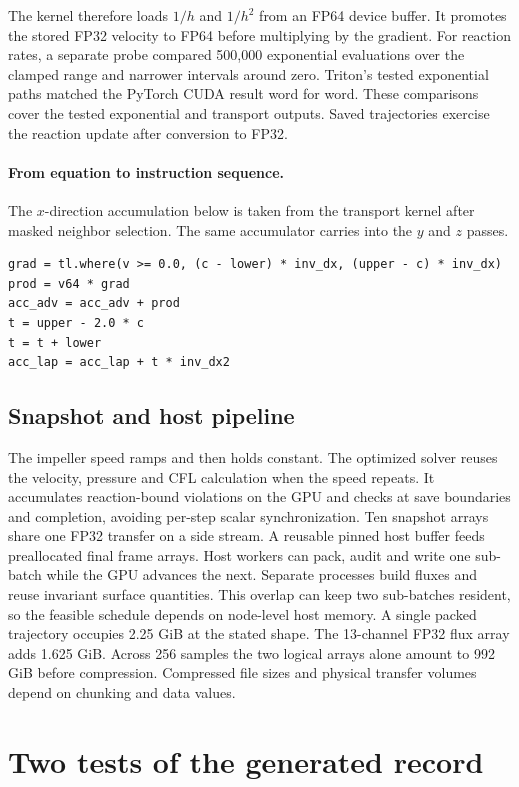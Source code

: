 \documentclass{article}
\begin{document}
The kernel therefore loads $1/h$ and $1/h^2$ from an FP64 device buffer. It promotes the stored FP32 velocity to FP64 before multiplying by the gradient. For reaction rates, a separate probe compared 500,000 exponential evaluations over the clamped range and narrower intervals around zero. Triton's tested exponential paths matched the PyTorch CUDA result word for word. These comparisons cover the tested exponential and transport outputs. Saved trajectories exercise the reaction update after conversion to FP32.

\paragraph{From equation to instruction sequence.} The $x$-direction accumulation below is taken from the transport kernel after masked neighbor selection. The same accumulator carries into the $y$ and $z$ passes.
{\small
\begin{verbatim}
grad = tl.where(v >= 0.0, (c - lower) * inv_dx, (upper - c) * inv_dx)
prod = v64 * grad
acc_adv = acc_adv + prod
t = upper - 2.0 * c
t = t + lower
acc_lap = acc_lap + t * inv_dx2
\end{verbatim}
}

\subsection{Snapshot and host pipeline}
The impeller speed ramps and then holds constant. The optimized solver reuses the velocity, pressure and CFL calculation when the speed repeats. It accumulates reaction-bound violations on the GPU and checks at save boundaries and completion, avoiding per-step scalar synchronization. Ten snapshot arrays share one FP32 transfer on a side stream. A reusable pinned host buffer feeds preallocated final frame arrays. Host workers can pack, audit and write one sub-batch while the GPU advances the next. Separate processes build fluxes and reuse invariant surface quantities. This overlap can keep two sub-batches resident, so the feasible schedule depends on node-level host memory. A single packed trajectory occupies 2.25 GiB at the stated shape. The 13-channel FP32 flux array adds 1.625 GiB. Across 256 samples the two logical arrays alone amount to 992 GiB before compression. Compressed file sizes and physical transfer volumes depend on chunking and data values.


\section{Two tests of the generated record}
\end{document}
